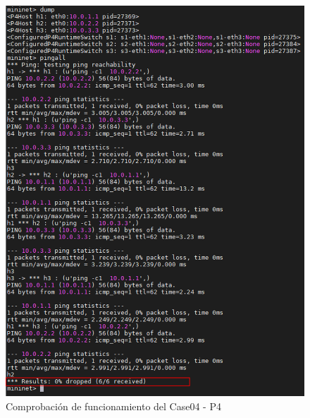 \newpage

\begin{figure}[ht]
    \centering
    \includegraphics[width=12cm]{archivos/img/dev/p4/case04/demo_case04_edited.png}
    \caption{Comprobación de funcionamiento del Case04 - P4}
    \label{fig:case04_p4_ether_func}
\end{figure}

\newpage

